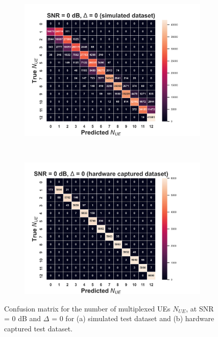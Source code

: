 \documentclass[journal]{IEEEtran}
\begin{document}
\begin{figure}[ht!]
    \captionsetup{justification=justified}
     \centering
     \begin{subfigure}[b]{0.48\textwidth}
         \centering
         \includegraphics[width=\textwidth]{Figures/Conf_mtx_num_UEs_SNR_0_dB_Max_off_0_train_sim_test_sim.png}
         \caption{}
         \label{fig: cm_num_UE_snr_0_off_0_sim}
     \end{subfigure}
     \\
     \begin{subfigure}[b]{0.48\textwidth}
         \centering
         \includegraphics[width=\textwidth]{Figures/Conf_mtx_num_UEs_SNR_0_dB_Max_off_0_train_sim_test_hw.png}
         \caption{}
         \label{fig: cm_num_UE_snr_0_off_0_hw}
     \end{subfigure}
        \caption{Confusion matrix for the number of multiplexed UEs $N_{UE}$, at SNR = $0$ dB and $\Delta$ = $0$ for (a) simulated test dataset and (b) hardware captured test dataset.}
        \label{fig: cm_num_UE_snr_0_off_0}
\end{figure}
\end{document}
